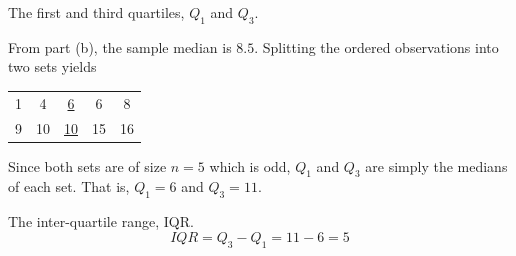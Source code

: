 \begin{example}
\begin{benumerate}
\item The first and third quartiles, $Q_1$ and $Q_3$. 

From part (b), the sample median is $8.5$. Splitting the ordered observations into two sets yields
\begin{center}
\def\arraystretch{1.5}
\begin{tabular}{ccccc}
1 & 4 & \underline{6} & 6 & 8 \\ 
9 & 10 & \underline{10} & 15 & 16
\end{tabular} 
\end{center}
Since both sets are of size $n=5$ which is odd, $Q_1$ and $Q_3$ are simply the medians of each set. That is, $Q_1 = 6$ and $Q_3 = 11$.
\item The inter-quartile range, IQR. 
\[ IQR = Q_3 - Q_1 = 11 - 6 = 5 \]
\end{benumerate}
\end{example}


